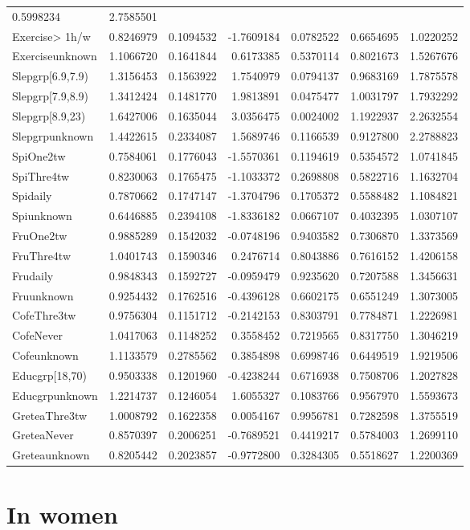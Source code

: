 \documentclass[]{article}
\begin{document}
\begin{longtable}[]{@{}lrrrrrr@{}}
0.5998234 & 2.7585501\tabularnewline
Exercise\textgreater{} 1h/w & 0.8246979 & 0.1094532 & -1.7609184 &
0.0782522 & 0.6654695 & 1.0220252\tabularnewline
Exerciseunknown & 1.1066720 & 0.1641844 & 0.6173385 & 0.5370114 &
0.8021673 & 1.5267676\tabularnewline
Slepgrp{[}6.9,7.9) & 1.3156453 & 0.1563922 & 1.7540979 & 0.0794137 &
0.9683169 & 1.7875578\tabularnewline
Slepgrp{[}7.9,8.9) & 1.3412424 & 0.1481770 & 1.9813891 & 0.0475477 &
1.0031797 & 1.7932292\tabularnewline
Slepgrp{[}8.9,23) & 1.6427006 & 0.1635044 & 3.0356475 & 0.0024002 &
1.1922937 & 2.2632554\tabularnewline
Slepgrpunknown & 1.4422615 & 0.2334087 & 1.5689746 & 0.1166539 &
0.9127800 & 2.2788823\tabularnewline
SpiOne2tw & 0.7584061 & 0.1776043 & -1.5570361 & 0.1194619 & 0.5354572 &
1.0741845\tabularnewline
SpiThre4tw & 0.8230063 & 0.1765475 & -1.1033372 & 0.2698808 & 0.5822716
& 1.1632704\tabularnewline
Spidaily & 0.7870662 & 0.1747147 & -1.3704796 & 0.1705372 & 0.5588482 &
1.1084821\tabularnewline
Spiunknown & 0.6446885 & 0.2394108 & -1.8336182 & 0.0667107 & 0.4032395
& 1.0307107\tabularnewline
FruOne2tw & 0.9885289 & 0.1542032 & -0.0748196 & 0.9403582 & 0.7306870 &
1.3373569\tabularnewline
FruThre4tw & 1.0401743 & 0.1590346 & 0.2476714 & 0.8043886 & 0.7616152 &
1.4206158\tabularnewline
Frudaily & 0.9848343 & 0.1592727 & -0.0959479 & 0.9235620 & 0.7207588 &
1.3456631\tabularnewline
Fruunknown & 0.9254432 & 0.1762516 & -0.4396128 & 0.6602175 & 0.6551249
& 1.3073005\tabularnewline
CofeThre3tw & 0.9756304 & 0.1151712 & -0.2142153 & 0.8303791 & 0.7784871
& 1.2226981\tabularnewline
CofeNever & 1.0417063 & 0.1148252 & 0.3558452 & 0.7219565 & 0.8317750 &
1.3046219\tabularnewline
Cofeunknown & 1.1133579 & 0.2785562 & 0.3854898 & 0.6998746 & 0.6449519
& 1.9219506\tabularnewline
Educgrp{[}18,70) & 0.9503338 & 0.1201960 & -0.4238244 & 0.6716938 &
0.7508706 & 1.2027828\tabularnewline
Educgrpunknown & 1.2214737 & 0.1246054 & 1.6055327 & 0.1083766 &
0.9567970 & 1.5593673\tabularnewline
GreteaThre3tw & 1.0008792 & 0.1622358 & 0.0054167 & 0.9956781 &
0.7282598 & 1.3755519\tabularnewline
GreteaNever & 0.8570397 & 0.2006251 & -0.7689521 & 0.4419217 & 0.5784003
& 1.2699110\tabularnewline
Greteaunknown & 0.8205442 & 0.2023857 & -0.9772800 & 0.3284305 &
0.5518627 & 1.2200369\tabularnewline
\bottomrule
\end{longtable}

\hypertarget{in-women-2}{%
\section{In women}\label{in-women-2}}
\end{document}
